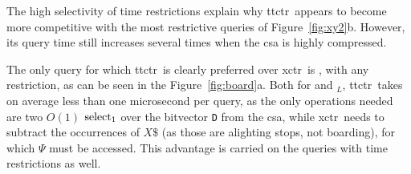    The high selectivity of time restrictions explain why \gls{ttctr}~appears to become more competitive with the most restrictive queries of Figure~\ref{fig:xy2}b. However, its query time still increases several times when the \gls{csa} is highly compressed.
    
    The only query for which \gls{ttctr}~is clearly preferred over \gls{xctr}~is \texttt{\boardX}, with any restriction, as can be seen in the Figure~\ref{fig:board}a. Both for \texttt{\boardX} and \texttt{\boardX$_{L}$}, \gls{ttctr}~takes on average less than one microsecond per query, as the only operations needed are two $O(1)$ $\operatorname{select}_1$ over the bitvector \texttt{D} from the \gls{csa}, while \gls{xctr}~needs to subtract the occurrences of $X\$$ (as those are alighting stops, not boarding), for which $\Psi$ must be accessed. This advantage is carried on the queries with time restrictions as well.
    
